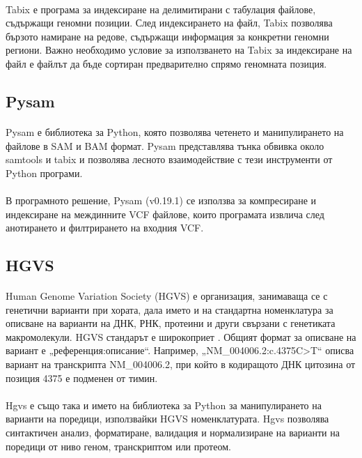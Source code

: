 \documentclass[pdftex,cyrillic,14pt,a4page,twoside,openright]{extreport}
\begin{document}
\paragraph{}
Tabix е 	програма за индексиране на делимитирани с табулация файлове, съдържащи геномни позиции. След индексирането на файл, Tabix позволява бързото намиране на редове, съдържащи информация за конкретни геномни региони. Важно необходимо условие за използването на Tabix за индексиране на файл е файлът да бъде сортиран предварително спрямо геномната позиция. 

\subsection{Pysam}\label{sec:pysam}
\paragraph{}
Pysam \cite{pysam} е библиотека за Python, която позволява четенето и манипулирането на файлове в SAM и BAM формат. Pysam представлява тънка обвивка около samtools и tabix и позволява лесното взаимодействие с тези инструменти от Python програми.

\paragraph{}
В програмното решение, Pysam (v0.19.1) се използва за компресиране и индексиране на междинните VCF файлове, които програмата извлича след анотирането и филтрирането на входния VCF.

\subsection{HGVS}\label{sec:hgvs}
\paragraph{}
Human Genome Variation Society (HGVS) е организация, занимаваща се с генетични варианти при хората, дала името и на стандартна номенклатура за описване на варианти на ДНК, РНК, протеини и други свързани с генетиката макромолекули. HGVS стандарът е широкоприет \cite{dunnen2016}. Общият формат за описване на вариант е „референция:описание“. Например, „NM\_004006.2:c.4375C>T“ описва вариант на транскрипта NM\_004006.2, при който в кодиращото ДНК цитозина от позиция 4375 е подменен от тимин.

\paragraph{}
Hgvs \cite{wang2018} е също така и името на библиотека за Python за манипулирането на варианти на поредици, използвайки HGVS номенклатурата. Hgvs позволява синтактичен анализ, форматиране, валидация и нормализиране на варианти на поредици от ниво геном, транскриптом или протеом.
\end{document}
